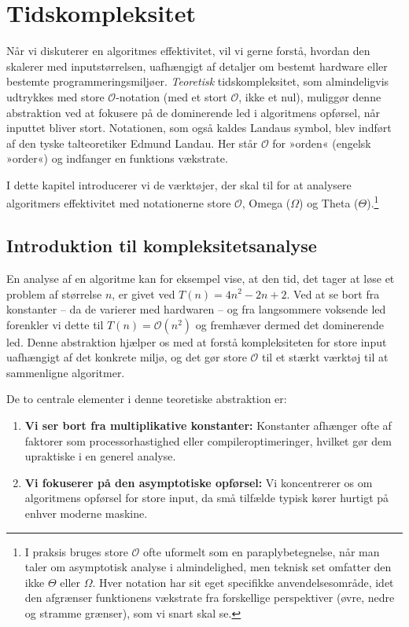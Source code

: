 \chapter{Tidskompleksitet}\label{chap:ch14}

Når vi diskuterer en algoritmes effektivitet, vil vi gerne forstå, hvordan den skalerer med inputstørrelsen, uafhængigt af detaljer om bestemt hardware eller bestemte programmeringsmiljøer. \textit{Teoretisk} tidskompleksitet, som almindeligvis udtrykkes med store $\mathcal{O}$-notation (med et stort $\mathcal{O}$, ikke et nul), muliggør denne abstraktion ved at fokusere på de dominerende led i algoritmens opførsel, når inputtet bliver stort. Notationen, som også kaldes Landaus symbol, blev indført af den tyske talteoretiker Edmund Landau. Her står $\mathcal{O}$ for »orden« (engelsk »order«) og indfanger en funktions vækstrate.

I dette kapitel introducerer vi de værktøjer, der skal til for at analysere algoritmers effektivitet med notationerne store $\mathcal{O}$, Omega ($\Omega$) og Theta ($\Theta$).\footnote{I praksis bruges store $\mathcal{O}$ ofte uformelt som en paraplybetegnelse, når man taler om asymptotisk analyse i almindelighed, men teknisk set omfatter den ikke $\Theta$ eller $\Omega$. Hver notation har sit eget specifikke anvendelsesområde, idet den afgrænser funktionens vækstrate fra forskellige perspektiver (øvre, nedre og stramme grænser), som vi snart skal se.}

\section{Introduktion til kompleksitetsanalyse}\label{sec:ch10sec1}

En analyse af en algoritme kan for eksempel vise, at den tid, det tager at løse et problem af størrelse $n$, er givet ved $T(n)=4 n^2-2 n+2$. Ved at se bort fra konstanter -- da de varierer med hardwaren -- og fra langsommere voksende led forenkler vi dette til $T(n)=\mathcal{O}\left(n^2\right)$ og fremhæver dermed det dominerende led. Denne abstraktion hjælper os med at forstå kompleksiteten for store input uafhængigt af det konkrete miljø, og det gør store $\mathcal{O}$ til et stærkt værktøj til at sammenligne algoritmer.

De to centrale elementer i denne teoretiske abstraktion er:

\begin{enumerate}
    \item \textbf{Vi ser bort fra multiplikative konstanter:} Konstanter afhænger ofte af faktorer som processorhastighed eller compileroptimeringer, hvilket gør dem upraktiske i en generel analyse.
    \item \textbf{Vi fokuserer på den asymptotiske opførsel:} Vi koncentrerer os om algoritmens opførsel for store input, da små tilfælde typisk kører hurtigt på enhver moderne maskine.
\end{enumerate}

